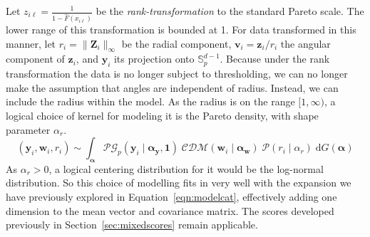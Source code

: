Let $z_{i\ell} = \frac{1}{1 - \hat{F}(x_{i\ell})}$ be the 
    \emph{rank-transformation} to the standard Pareto scale.  The lower range 
    of this transformation is bounded at 1. For data transformed in this manner, 
    let $r_i = \lVert \bm{Z}_i\rVert_{\infty}$ be the radial component, 
    $\bm{v}_i = \bm{z}_i/r_i$ the angular component of $\bm{z}_i$, and 
    $\bm{y}_i$ its projection onto $\mathbb{S}_p^{d-1}$.  Because under the 
    rank transformation the data is no longer subject to thresholding, we can 
    no longer make the assumption that angles are independent of radius.  
    Instead, we can include the radius within the model.  As the radius is on 
    the range $[1,\infty)$, a logical choice of kernel for modeling it is the 
    Pareto density, with shape parameter $\alpha_r$.  
    \begin{equation}
        \label{model:rank}
        (\bm{y}_i,\bm{w}_i,r_i) \sim \int_{\bm{\alpha}}
            \mathcal{PG}_p(\bm{y}_i\mid\bm{\alpha}_{\bm{y}}, \bm{1})\;
            \mathcal{CDM}(\bm{w}_i\mid\bm{\alpha}_{\bm{w}})\;
            \mathcal{P}(r_i\mid\alpha_r)\;
            \text{d}G(\bm{\alpha})
    \end{equation}
    As $\alpha_r > 0$, a logical centering distribution for it would be the 
    log-normal distribution.  So this choice of modelling fits in very well 
    with the expansion we have previously explored in 
    Equation~\ref{eqn:modelcat}, effectively adding one dimension to the mean 
    vector and covariance matrix.  The scores developed previously in 
    Section~\ref{sec:mixedscores} remain applicable.

